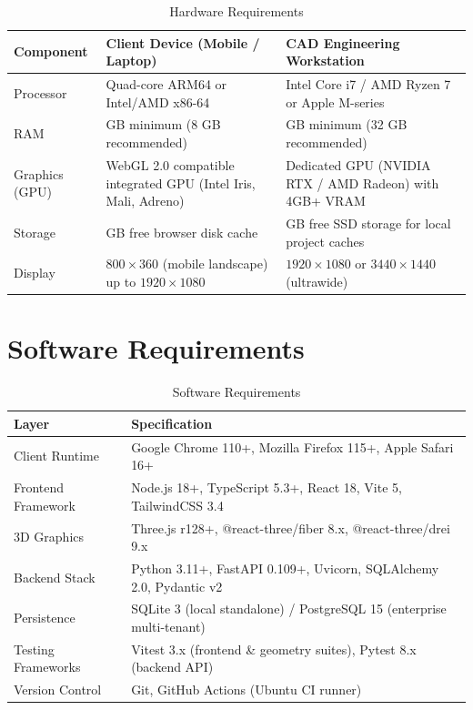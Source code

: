 \documentclass[12pt,a4paper]{report}
\begin{document}
\begin{table}[H]
\centering
\small
\caption{Hardware Requirements}
\label{tab:hw}
\renewcommand{\arraystretch}{1.3}
\begin{tabularx}{\textwidth}{|>{\raggedright\arraybackslash}p{2.6cm}|>{\raggedright\arraybackslash}X|>{\raggedright\arraybackslash}X|}
\hline
\textbf{Component} & \textbf{Client Device (Mobile / Laptop)} & \textbf{CAD Engineering Workstation} \\
\hline
Processor & Quad-core ARM64 or Intel/AMD x86-64 & Intel Core i7 / AMD Ryzen 7 or Apple M-series \\
\hline
RAM & 4 GB minimum (8 GB recommended) & 16 GB minimum (32 GB recommended) \\
\hline
Graphics (GPU) & WebGL 2.0 compatible integrated GPU (Intel Iris, Mali, Adreno) & Dedicated GPU (NVIDIA RTX / AMD Radeon) with 4GB+ VRAM \\
\hline
Storage & 1 GB free browser disk cache & 10 GB free SSD storage for local project caches \\
\hline
Display & $800\times360$ (mobile landscape) up to $1920\times1080$ & $1920\times1080$ or $3440\times1440$ (ultrawide) \\
\hline
\end{tabularx}
\end{table}

\section{Software Requirements}

\begin{table}[H]
\centering
\small
\caption{Software Requirements}
\label{tab:sw}
\renewcommand{\arraystretch}{1.3}
\begin{tabularx}{\textwidth}{|>{\raggedright\arraybackslash}p{3.6cm}|>{\raggedright\arraybackslash}X|}
\hline
\textbf{Layer} & \textbf{Specification} \\
\hline
Client Runtime & Google Chrome 110+, Mozilla Firefox 115+, Apple Safari 16+ \\
\hline
Frontend Framework & Node.js 18+, TypeScript 5.3+, React 18, Vite 5, TailwindCSS 3.4 \\
\hline
3D Graphics & Three.js r128+, @react-three/fiber 8.x, @react-three/drei 9.x \\
\hline
Backend Stack & Python 3.11+, FastAPI 0.109+, Uvicorn, SQLAlchemy 2.0, Pydantic v2 \\
\hline
Persistence & SQLite 3 (local standalone) / PostgreSQL 15 (enterprise multi-tenant) \\
\hline
Testing Frameworks & Vitest 3.x (frontend \& geometry suites), Pytest 8.x (backend API) \\
\hline
Version Control & Git, GitHub Actions (Ubuntu CI runner) \\
\hline
\end{tabularx}
\end{table}
\end{document}
